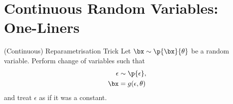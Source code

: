 \documentclass{beamer}
\begin{document}
\section{Continuous Random Variables: One-Liners}

	\begin{frame}{(Continuous) Reparametrisation Trick}
		Let $\bx \sim \p{\bx}{\theta}$ be a random variable. Perform change of variables such that
		\begin{equation}
			\begin{aligned}
				\epsilon &\sim \p{\epsilon},\\
				\bx &= g( \epsilon, \theta)
			\end{aligned}
		\end{equation}
		and treat $\epsilon$ as if it was a constant.
		
	\end{frame}
\end{document}
